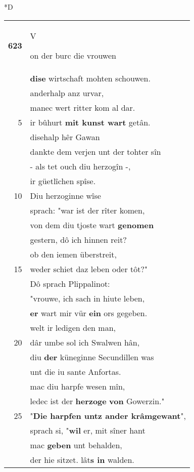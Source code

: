 \documentclass[8pt,a4paper,notitlepage]{article}
\begin{document}
\begin{table}[ht]
\begin{minipage}[t]{0.5\linewidth}
\small
\begin{center}*D
\end{center}
\begin{tabular}{rl}
\textbf{623} & \begin{large}V\end{large}on der burc die vrouwen\\ 
 & \textbf{dise} wirtschaft mohten schouwen.\\ 
 & anderhalp anz urvar,\\ 
 & manec wert ritter kom al dar.\\ 
5 & ir bûhurt \textbf{mit kunst wart} getân.\\ 
 & disehalp hêr Gawan\\ 
 & dankte dem verjen unt der tohter sîn\\ 
 & - als tet ouch diu herzogîn -,\\ 
 & ir güetlîchen spîse.\\ 
10 & Diu herzoginne wîse\\ 
 & sprach: "war ist der rîter komen,\\ 
 & von dem diu tjoste wart \textbf{genomen}\\ 
 & gestern, dô ich hinnen reit?\\ 
 & ob den iemen überstreit,\\ 
15 & weder schiet daz leben oder tôt?"\\ 
 & Dô sprach Plippalinot:\\ 
 & "vrouwe, ich sach in hiute leben,\\ 
 & \textbf{er} wart mir vür \textbf{ein} ors gegeben.\\ 
 & welt ir ledigen den man,\\ 
20 & dâr umbe sol ich Swalwen hân,\\ 
 & diu \textbf{der} küneginne Secundillen was\\ 
 & unt die iu sante Anfortas.\\ 
 & mac diu harpfe wesen mîn,\\ 
 & ledec ist der \textbf{herzoge} \textbf{von} Gowerzin."\\ 
25 & "\textbf{Die harpfen untz ander krâmgewant}",\\ 
 & sprach si, "\textbf{wil} er, mit sîner hant\\ 
 & mac \textbf{geben} unt behalden,\\ 
 & der hie sitzet. lât\textbf{s in} walden.\\ 

\end{tabular}
\end{minipage}
\end{table}
\end{document}
